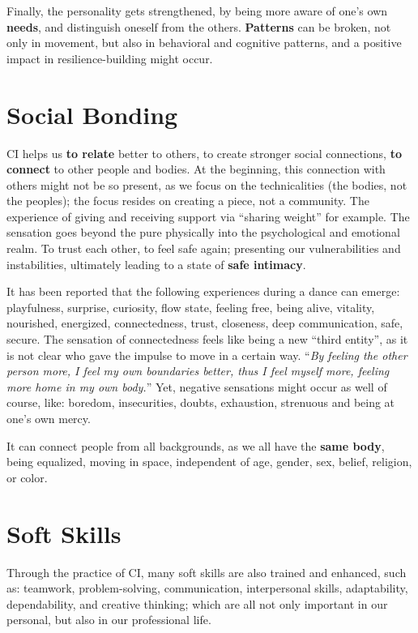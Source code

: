 Finally, the personality gets strengthened, by being more aware of one's own \textbf{needs}, and distinguish oneself from the others.
\textbf{Patterns} can be broken, not only in movement, but also in behavioral and cognitive patterns, and a positive impact in resilience-building might occur.

\section{Social Bonding}\label{sec:social-bonding}

CI helps us \textbf{to relate} better to others, to create stronger social connections, \textbf{to connect} to other people and bodies.
At the beginning, this connection with others might not be so present, as we focus on the technicalities (the bodies, not the peoples); the focus resides on creating a piece, not a community.
The experience of giving and receiving support via ``sharing weight'' for example.
The sensation goes beyond the pure physically into the psychological and emotional realm.
To trust each other, to feel safe again; presenting our vulnerabilities and instabilities, ultimately leading to a state of \textbf{safe intimacy}.

It has been reported that the following experiences during a dance can emerge: playfulness, surprise, curiosity, flow state, feeling free, being alive, vitality, nourished, energized, connectedness, trust, closeness, deep communication, safe, secure.
The sensation of connectedness feels like being a new ``third entity'', as it is not clear who gave the impulse to move in a certain way.
``\textit{By feeling the other person more, I feel my own boundaries better, thus I feel myself more, feeling more home in my own body.}''
Yet, negative sensations might occur as well of course, like: boredom, insecurities, doubts, exhaustion, strenuous and being at one's own mercy.

It can connect people from all backgrounds, as we all have the \textbf{same body}, being equalized, moving in space, independent of age, gender, sex, belief, religion, or color.

\section{Soft Skills}\label{sec:soft-skills}

Through the practice of CI, many soft skills are also trained and enhanced, such as: teamwork, problem-solving, communication, interpersonal skills, adaptability, dependability, and creative thinking; which are all not only important in our personal, but also in our professional life.


